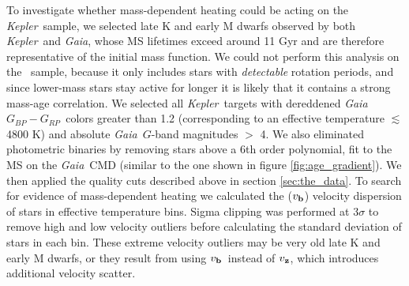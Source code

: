 \documentclass{aastex63}
\newcommand{\kepler}{{\it Kepler}}
\newcommand{\gaia}{{\it Gaia}}
\newcommand{\vz}{$v_{\bf z}$}
\newcommand{\vb}{$v_{\bf b}$}
\newcommand{\gcolor}{$G_{BP} - G_{RP}$}
\newcommand{\mct}{\citet{mcquillan2014}}
\begin{document}
To investigate whether mass-dependent heating could be acting on the \kepler\
sample, we selected late K and early M dwarfs observed by both \kepler\ and
\gaia, whose MS lifetimes exceed around 11 Gyr and are therefore
representative of the initial mass function.
We could not perform this analysis on the \mct\ sample, because it only
includes stars with {\it detectable} rotation periods, and since lower-mass
stars stay active for longer it is likely that it contains a strong mass-age
correlation.
We selected all \kepler\ targets with dereddened \gaia\ \gcolor\ colors
greater than 1.2 (corresponding to an effective temperature $\lesssim$
4800 K) and absolute \gaia\ $G$-band magnitudes $>$ 4.
We also eliminated photometric binaries by removing stars above a 6th order
polynomial, fit to the MS on the \gaia\ CMD (similar to the one shown in
figure \ref{fig:age_gradient}).
We then applied the quality cuts described above in section
\ref{sec:the_data}.
To search for evidence of mass-dependent heating we calculated the (\vb)
velocity dispersion of stars in effective temperature bins.
Sigma clipping was performed at 3$\sigma$ to remove high and low velocity
outliers before calculating the standard deviation of stars in each bin.
These extreme velocity outliers may be very old late K and early M dwarfs, or
they result from using \vb\ instead of \vz, which introduces additional
velocity scatter.
\end{document}
